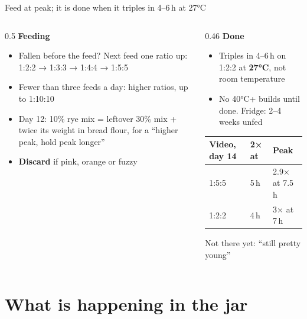 \documentclass[aspectratio=169,11pt]{beamer}
\begin{document}
\begin{frame}{Feed at peak; it is done when it triples in 4--6\,h at 27°C}
  \small
  \begin{columns}[T]
    \begin{column}{0.5\textwidth}
      \textbf{\color{crust}Feeding}
      \begin{itemize}
        \item Fallen before the feed? Next feed one ratio up: 1:2:2 → 1:3:3 → 1:4:4 → 1:5:5
        \item Fewer than three feeds a day: higher ratios, up to 1:10:10
        \item Day 12: 10\% rye mix = leftover 30\% mix + twice its weight in bread flour, for a ``higher peak, hold peak longer''
        \item \textbf{Discard} if pink, orange or fuzzy
      \end{itemize}
    \end{column}
    \begin{column}{0.46\textwidth}
      \textbf{\color{crust}Done}
      \begin{itemize}
        \item Triples in 4--6\,h on 1:2:2 at \textbf{27°C}, not room temperature
        \item No 40°C+ builds until done. Fridge: 2--4 weeks unfed
      \end{itemize}
      \smallskip
      {\footnotesize
      \begin{tabular}{@{}lll@{}}
        \toprule
        Video, day 14 & 2× at & Peak \\
        \midrule
        1:5:5 & 5\,h & 2.9× at 7.5\,h \\
        1:2:2 & 4\,h & 3× at 7\,h \\
        \bottomrule
      \end{tabular}\par\smallskip
      Not there yet: ``still pretty young''}
    \end{column}
  \end{columns}
\end{frame}

\section{What is happening in the jar}
\end{document}
